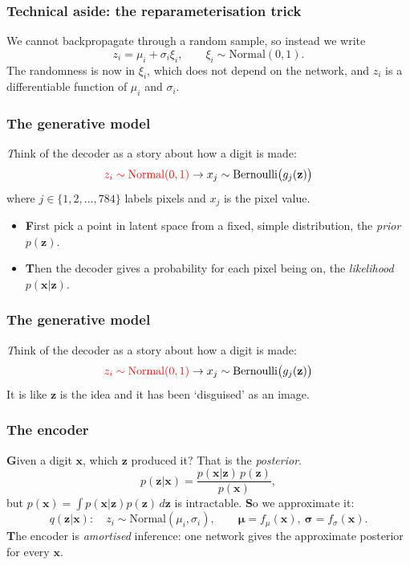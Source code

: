 \documentclass{beamer}
\begin{document}
\begin{frame}
  \frametitle{Technical aside: the reparameterisation trick}
\vfill
We cannot backpropagate through a random sample, so instead we write
$$
z_i=\mu_i+\sigma_i\xi_i,\qquad \xi_i\sim\text{Normal}(0,1).
$$
\vfill
The randomness is now in $\xi_i$, which does not depend on the network, and $z_i$ is a differentiable function of $\mu_i$ and $\sigma_i$.
\vfill
\end{frame}

\begin{frame}
  \frametitle{The generative model}
\vfill
\textsl{T}hink of the decoder as a story about how a digit is made:
$$
\textcolor{red}{z_i\sim\text{Normal}(0,1)} \rightarrow x_j\sim\text{Bernoulli}\big(g_j(\mathbf{z})\big)
$$
where $j\in \{1,2,\ldots, 784\}$ labels pixels and $x_j$ is the pixel value.
\vfill
\begin{itemize}
\item \textbf{F}irst pick a point in latent space from a fixed, simple distribution, the \emph{prior} $p(\mathbf{z})$.
\item \textbf{T}hen the decoder gives a probability for each pixel being on, the \emph{likelihood} $p(\mathbf{x}|\mathbf{z})$.
\end{itemize}
\vfill
\end{frame}

\begin{frame}
  \frametitle{The generative model}
\vfill
\textsl{T}hink of the decoder as a story about how a digit is made:
$$
\textcolor{red}{z_i\sim\text{Normal}(0,1)} \rightarrow x_j\sim\text{Bernoulli}\big(g_j(\mathbf{z})\big)
$$
\vfill
It is like $\mathbf{z}$ is the idea and it has been `disguised' as an image. 
\vfill
\end{frame}


\begin{frame}
  \frametitle{The encoder}
\vfill
\textbf{G}iven a digit $\mathbf{x}$, which $\mathbf{z}$ produced it? That is the \textsl{posterior}.
$$
p(\mathbf{z}|\mathbf{x})=\frac{p(\mathbf{x}|\mathbf{z})\,p(\mathbf{z})}{p(\mathbf{x})},
$$
but $p(\mathbf{x})=\int p(\mathbf{x}|\mathbf{z})p(\mathbf{z})\,d\mathbf{z}$ is intractable.
\vfill
\textbf{S}o we approximate it:
$$
q(\mathbf{z}|\mathbf{x}):\quad z_i\sim\text{Normal}(\mu_i,\sigma_i),\qquad \boldsymbol{\mu}=f_\mu(\mathbf{x}),\ \boldsymbol{\sigma}=f_\sigma(\mathbf{x}).
$$
\textbf{T}he encoder is \emph{amortised} inference: one network gives the approximate posterior for every $\mathbf{x}$.
\vfill
\end{frame}
\end{document}

